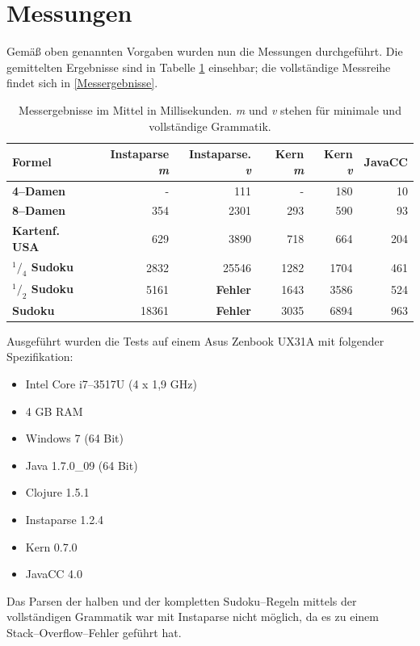 \documentclass[ngerman,a4paper,abstracton,open=right,twoside=false,toc=listofnumbered,bibtotocnumbered]{scrreprt}
\begin{document}
\section{Messungen}

Gemäß oben genannten Vorgaben wurden nun die Messungen durchgeführt. Die gemittelten Ergebnisse sind in Tabelle \ref{messergebnisse-kurz} einsehbar; die vollständige Messreihe findet sich in \ref{Messergebnisse}.

\begin{table}[h]
	\begin{tabular}{|l|r|r|r|r|r|}
		\hline
		\textbf{Formel} & \textbf{Instaparse \emph{m}} & \textbf{Instaparse. \emph{v}} & \textbf{Kern \emph{m}} & \textbf{Kern \emph{v}} & \textbf{JavaCC} \\ \hline
		\textbf{4--Damen} & - & 111 & - & 180 & 10 \\ \hline
		\textbf{8--Damen} & 354 & 2301 & 293 & 590 & 93 \\ \hline
		\textbf{Kartenf. USA} & 629 & 3890 & 718 & 664 & 204 \\ \hline
		\textbf{$^1/_4$ Sudoku} & 2832 & 25546 & 1282 & 1704 & 461 \\ \hline
		\textbf{$^1/_2$ Sudoku} & 5161 & \textbf{Fehler} & 1643 & 3586 & 524 \\ \hline
		\textbf{Sudoku} & 18361 & \textbf{Fehler} & 3035 & 6894 & 963 \\ \hline 
	\end{tabular}
	\label{messergebnisse-kurz}
	\caption{Messergebnisse im Mittel in Millisekunden. \emph{m} und \emph{v} stehen für \glqq{}minimale\grqq{} und \glqq{}vollständige Grammatik\grqq.}
\end{table}

Ausgeführt wurden die Tests auf einem Asus Zenbook UX31A mit folgender Spezifikation:

\begin{itemize}
	\item Intel Core i7--3517U (4 x 1,9 GHz)
	\item 4 GB RAM
	\item Windows 7 (64 Bit)
	\item Java 1.7.0\_09 (64 Bit)
	\item Clojure 1.5.1
	\item Instaparse 1.2.4
	\item Kern 0.7.0
	\item JavaCC 4.0
\end{itemize}

Das Parsen der halben und der kompletten Sudoku--Regeln mittels der vollständigen Grammatik war mit Instaparse nicht möglich, da es zu einem Stack--Overflow--Fehler geführt hat.
\end{document}

